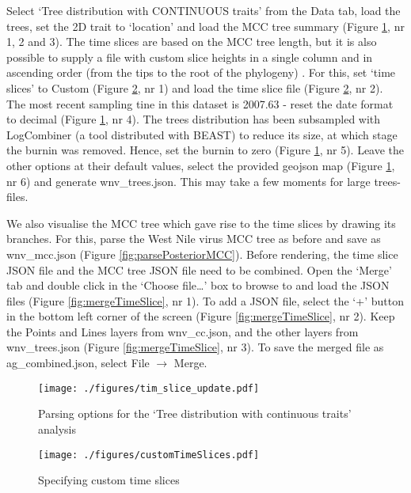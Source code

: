 \documentclass[english]{paper}
\begin{document}
Select `Tree distribution with CONTINUOUS traits' from the Data tab, load the trees, set the 2D trait to `location' and load the MCC tree summary 
(Figure \ref{fig:parsePosterior}, nr 1, 2 and 3).
The time slices are based on the MCC tree length, but it is also possible to supply a file with custom slice heights in a single column and in ascending order (from the tips to the root of the phylogeny) . 
For this, set `time slices' to Custom (Figure \ref{fig:customTimeSlices}, nr 1) and load the time slice file (Figure \ref{fig:customTimeSlices}, nr 2).
The most recent sampling tine in this dataset is 2007.63 - reset the date format to decimal 
(Figure \ref{fig:parsePosterior}, nr 4).
The trees distribution has been subsampled with LogCombiner (a tool distributed with BEAST) to reduce its size, at which stage the burnin was removed. 
Hence, set the burnin to zero 
(Figure \ref{fig:parsePosterior}, nr 5).
Leave the other options at their default values, select the provided geojson map (Figure \ref{fig:parsePosterior}, nr 6) and generate wnv\_trees.json.
This may take a few moments for large trees-files.
\par
We also visualise the MCC tree which gave rise to the time slices by drawing its branches.
For this, parse the West Nile virus MCC tree as before and save as wnv\_mcc.json (Figure \ref{fig:parsePosteriorMCC}).
Before rendering, the time slice JSON file and the MCC tree JSON file need to be combined.
Open the `Merge' tab and double click in the `Choose file\dots' box to browse to and load the JSON files (Figure \ref{fig:mergeTimeSlice}, nr 1).
To add a JSON file, select the `+' button in the bottom left corner of the screen (Figure \ref{fig:mergeTimeSlice}, nr 2).
Keep the Points and Lines layers from wnv\_cc.json, and the other layers from wnv\_trees.json (Figure \ref{fig:mergeTimeSlice}, nr 3).
To save the merged file as ag\_combined.json, select File $\rightarrow$  Merge. 

\begin{figure}%
\centering
\texttt{[image: ./figures/tim\_slice\_update.pdf]}
\caption{Parsing options for the `Tree distribution with continuous traits' analysis}
\label{fig:parsePosterior}
\end{figure}

\begin{figure}%
\centering
\texttt{[image: ./figures/customTimeSlices.pdf]} 
\caption{Specifying custom time slices}
\label{fig:customTimeSlices}
\end{figure}
\end{document}
